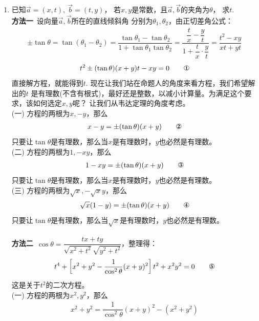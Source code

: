 \begin{enumerate}[label={【\textbf{例\thechapter.\arabic*}】},
 leftmargin=\inteval{\myenumleftmargin}pt,
 itemsep=\inteval{\myenumitempsep}pt,
 itemindent=\inteval{\myenumitemindent}pt]
\item 已知$ \vec{a}=(x,t),\ \vec{b}=(t,y) $，
若$ x,y $是常数，且$ \vec{a},\vec{b} $的夹角为$ \theta $，
求$ t $. \\
\textbf{方法一}\ 设向量$ \vec{a},\vec{b} $所在的直线倾斜角
分别为$ \theta_1,\theta_2 $，由正切差角公式：
\begin{gather*}
    \pm\tan\theta=\tan(\theta_1-\theta_2)=\dfrac{\tan\theta_1-\tan\theta_2}
    {1+\tan\theta_1	\tan\theta_2}=\dfrac{\dfrac{t}{x}-\dfrac{y}{t}}{1+
        \dfrac{t}{x}\cdot\dfrac{y}{t}}=\dfrac{t^2-xy}{xt+yt} 
\end{gather*}
\begin{gather}
    t^2\pm(\tan\theta)(x+y)t-xy=0   \tag*{\ding{172}}
\end{gather}
直接解方程，就能得到$ t $. 
现在让我们站在命题人的角度来看方程，我们希望解出的$ t $
是有理数(不含有根式)，最好还是整数，以减小计算量。为满足这个要求，该如何选定$ x,y $呢？
让我们从韦达定理的角度考虑。\\
(一) 方程的两根为$ x,-y $，那么
\begin{gather}
    x-y=\pm(\tan\theta)(x+y)  \tag*{\ding{173}}
\end{gather}
只要让$ \tan\theta $是有理数，那么当$ x $是有理数时，$ y $也必然是有理数。\\
(二) 方程的两根为$ 1,-xy $，那么
\begin{gather}
    1-xy=\pm(\tan\theta)(x+y) \tag*{\ding{174}}
\end{gather}
只要让$ \tan\theta $是有理数，那么当$ x $是有理数时，$ y $也必然是有理数。\\
(三) 方程的两根为$ \sqrt{x},-\sqrt{x}y $，那么
\begin{gather}
    \sqrt{x}(1-y)=\pm(\tan\theta)(x+y) \tag*{\ding{175}}
\end{gather}
只要让$ \tan\theta $是有理数，那么当$ \sqrt{x} $是有理数时，$ y $也必然是有理数。\\
\\
\textbf{方法二}\ $ \cos\theta=\dfrac{tx+ty}{\sqrt{x^2+t^2}\sqrt{y^2+t^2}} $，整理得：
\begin{align}
    t^4+\left[x^2+y^2-\dfrac{1}{\cos^2\theta}(x+y)^2\right]
    t^2+x^2y^2=0  \tag*{\ding{176}}
\end{align}
这是关于$ t^2 $的二次方程。\\
(一) 方程的两根为$ x^2,y^2 $，那么
\begin{gather*}
    x^2+y^2=\dfrac{1}{\cos^2\theta}(x+y)^2-(x^2+y^2) \\

\end{gather*}
\end{enumerate}
